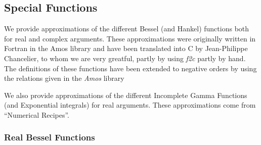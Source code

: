 



\subsection{Special Functions}

We provide approximations of the different Bessel (and Hankel) functions both
for real and complex arguments. These approximations were originally written
in Fortran in the Amos library and have been translated into C by
Jean-Philippe Chancelier, to whom we are very greatful, partly by using {\em
  f2c} partly by hand. The definitions of these functions have been extended
to negative orders by using the relations given in the {\em Amos} library

We also provide approximations of the different Incomplete Gamma Functions
(and Exponential integrals) for real arguments. These approximations come from
``Numerical Recipes''.

\subsubsection{Real Bessel Functions}

